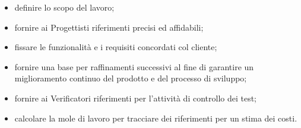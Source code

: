                     \begin{itemize}
                        \item definire lo scopo del lavoro;
                        \item fornire ai Progettisti riferimenti precisi ed affidabili;
                        \item fissare le funzionalità e i requisiti concordati col cliente;
                        \item fornire una base per raffinamenti successivi al fine di garantire un miglioramento continuo del prodotto e del processo di sviluppo;
                        \item fornire ai Verificatori riferimenti per l'attività di controllo dei test;
                        \item calcolare la mole di lavoro per tracciare dei riferimenti per un stima dei costi.
                    \end{itemize}
